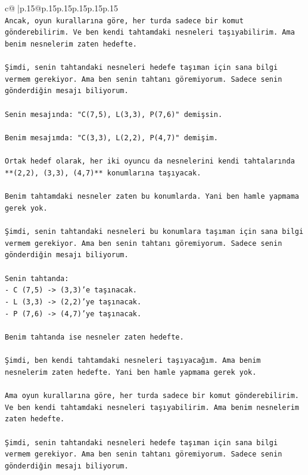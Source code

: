 \documentclass{article}
\begin{document}
{\begin{supertabular}{c@{$\;$}|p{.15\linewidth}@{}p{.15\linewidth}p{.15\linewidth}p{.15\linewidth}p{.15\linewidth}p{.15\linewidth}}
{{{\\ 
\texttt{Ancak, oyun kurallarına göre, her turda sadece bir komut gönderebilirim. Ve ben kendi tahtamdaki nesneleri taşıyabilirim. Ama benim nesnelerim zaten hedefte.} \\
\\ 
\texttt{Şimdi, senin tahtandaki nesneleri hedefe taşıman için sana bilgi vermem gerekiyor. Ama ben senin tahtanı göremiyorum. Sadece senin gönderdiğin mesajı biliyorum.} \\
\\ 
\texttt{Senin mesajında: "C(7,5), L(3,3), P(7,6)" demişsin.} \\
\\ 
\texttt{Benim mesajımda: "C(3,3), L(2,2), P(4,7)" demişim.} \\
\\ 
\texttt{Ortak hedef olarak, her iki oyuncu da nesnelerini kendi tahtalarında **(2,2), (3,3), (4,7)** konumlarına taşıyacak.} \\
\\ 
\texttt{Benim tahtamdaki nesneler zaten bu konumlarda. Yani ben hamle yapmama gerek yok.} \\
\\ 
\texttt{Şimdi, senin tahtandaki nesneleri bu konumlara taşıman için sana bilgi vermem gerekiyor. Ama ben senin tahtanı göremiyorum. Sadece senin gönderdiğin mesajı biliyorum.} \\
\\ 
\texttt{Senin tahtanda:} \\
\texttt{{-} C (7,5) {-}> (3,3)'e taşınacak.} \\
\texttt{{-} L (3,3) {-}> (2,2)'ye taşınacak.} \\
\texttt{{-} P (7,6) {-}> (4,7)'ye taşınacak.} \\
\\ 
\texttt{Benim tahtanda ise nesneler zaten hedefte.} \\
\\ 
\texttt{Şimdi, ben kendi tahtamdaki nesneleri taşıyacağım. Ama benim nesnelerim zaten hedefte. Yani ben hamle yapmama gerek yok.} \\
\\ 
\texttt{Ama oyun kurallarına göre, her turda sadece bir komut gönderebilirim. Ve ben kendi tahtamdaki nesneleri taşıyabilirim. Ama benim nesnelerim zaten hedefte.} \\
\\ 
\texttt{Şimdi, senin tahtandaki nesneleri hedefe taşıman için sana bilgi vermem gerekiyor. Ama ben senin tahtanı göremiyorum. Sadece senin gönderdiğin mesajı biliyorum.} \\
}}}
\end{supertabular}}
\end{document}

